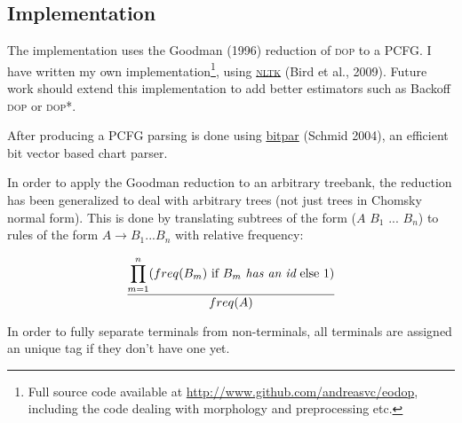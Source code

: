 \documentclass[10pt,a4paper]{article}
\begin{document}
\subsection{Implementation}

The implementation uses the Goodman (1996) reduction of \textsc{dop} to a PCFG. I have
written my own
implementation\footnote{Full source code available at \url{http://www.github.com/andreasvc/eodop}, including the code dealing with morphology and preprocessing etc.}, using
\href{http://groups.google.com/group/nltk-dev/browse_thread/thread/86ca038723195978/c112b8d171b33d25}{\textsc{nltk}} (Bird et al., 2009). Future work should extend
this implementation to add better estimators such as Backoff \textsc{dop} or \textsc{dop}*.

After producing a PCFG parsing is done using
\href{http://www.ims.uni-stuttgart.de/tcl/SOFTWARE/BitPar.html}{bitpar} 
(Schmid 2004), an efficient bit vector based chart parser.

%

In order to apply the Goodman reduction to an arbitrary treebank, the reduction
has been generalized to deal with arbitrary trees (not just trees in Chomsky
normal form). This is done by translating subtrees of the form 
($A$ $B_1$ ... $B_n$) to rules of the form $A \rightarrow B_1 ... B_n$ with
relative frequency:

\[
\frac{\displaystyle\prod_{m = 1}^n(
\text{$freq(B_m)$ if $B_m$ {\em has an id} else $1$})}{freq(A)}
\] 

\vspace{2em}
In order to fully separate terminals from non-terminals, all terminals are
assigned an unique tag if they don't have one yet.

\begin{comment}
Previously considered possibilities:

\begin{itemize}
\item \href{http://staff.science.uva.nl/~simaan/dopdis/}{dopdis} (C): already
has Goodman reduction and \textsc{dop}*;
\item \href{http://sourceforge.net/projects/lilian/}{lilian} (Java): has
Goodman reduction, no \textsc{dop}*; also has U-DOP.
\item Gideon Borensztajn's \href{http://staff.science.uva.nl/~gideon/sourcecode/DOPParser.tar.gz}{DOPParser} (Java): has Goodman reduction
\end{itemize}
\end{comment}
\end{document}
